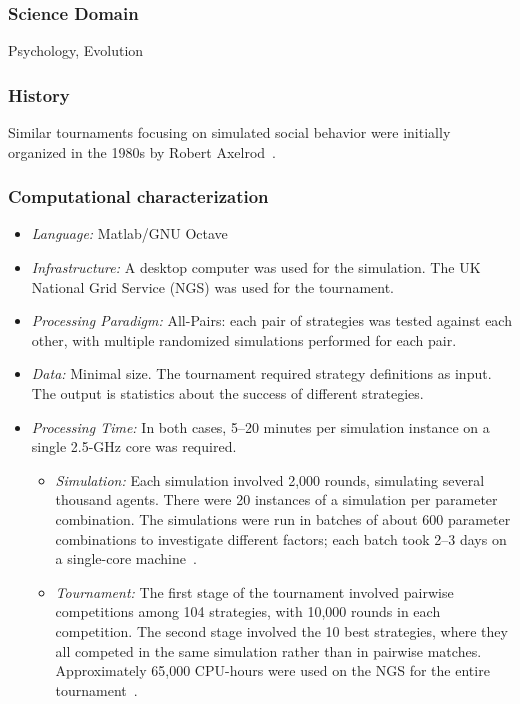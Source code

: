 \documentclass[10pt,letterpaper]{article}
\begin{document}
\subsubsection{Science Domain} Psychology, Evolution

\subsubsection{History}
Similar tournaments focusing on simulated social
behavior were initially organized in the 1980s by Robert Axelrod~\cite{rendell-sociallearning-10}.

\subsubsection{Computational characterization}


\begin {itemize}
\item {\em Language:} Matlab/GNU Octave
\item {\em Infrastructure:}  A desktop computer was used for the simulation.  The UK National Grid Service (NGS) was used for the tournament.
\item {\em Processing Paradigm:} All-Pairs: each pair of strategies was tested
    against each other, with multiple randomized simulations performed for
    each pair.
\item {\em Data:} Minimal size.  The tournament required strategy definitions
            as input.  The output is statistics about the success
            of different strategies.
\item {\em Processing Time:} In both cases, 5--20 minutes per simulation
            instance on a single 2.5-GHz core was required.
    \begin{itemize}
        \item {\em Simulation:}  Each simulation involved 2,000 rounds,
        simulating several thousand agents.  There were 20 instances
        of a simulation per parameter combination.  The simulations were
        run in batches of about 600 parameter combinations to investigate
        different factors; each batch took 2--3 days on a single-core machine~\cite{rendell-email-10}.
        \item {\em Tournament:}
        The first stage of the tournament involved pairwise competitions among
        104 strategies, with 10,000 rounds in each competition.
        The second stage involved the 10 best strategies,
        where they all competed in the same simulation rather than in pairwise
        matches.  Approximately 65,000 CPU-hours were used on
        the NGS for the entire tournament~\cite{rendell-email-10}.
    \end{itemize}
\end {itemize}
\end{document}

